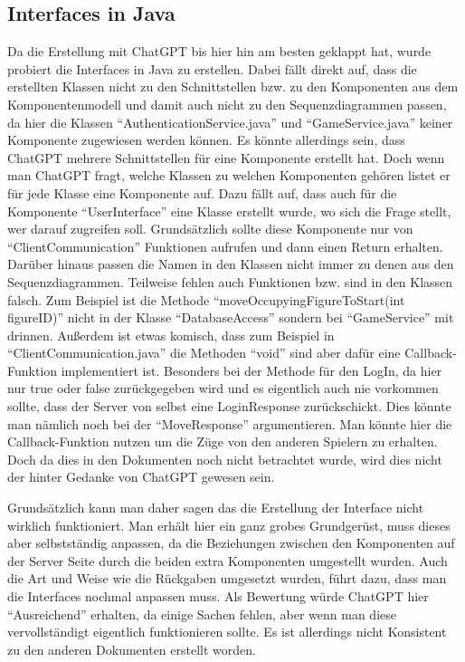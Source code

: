 \subsection*{Interfaces in Java}

Da die Erstellung mit ChatGPT bis hier hin am besten geklappt hat, wurde probiert die Interfaces in Java 
zu erstellen. Dabei fällt direkt auf, dass die erstellten Klassen nicht zu den Schnittstellen bzw. zu den 
Komponenten aus dem Komponentenmodell und damit auch nicht zu den Sequenzdiagrammen passen, da hier 
die Klassen ``AuthenticationService.java'' und ``GameService.java'' keiner 
Komponente zugewiesen werden können. Es könnte allerdings sein, dass ChatGPT mehrere Schnittstellen für eine 
Komponente erstellt hat. Doch wenn man ChatGPT fragt, welche Klassen zu welchen Komponenten gehören
listet er für jede Klasse eine Komponente auf. Dazu fällt auf, dass auch für die Komponente ``UserInterface''
eine Klasse erstellt wurde, wo sich die Frage stellt, wer darauf zugreifen soll. Grundsätzlich sollte diese 
Komponente nur von ``ClientCommunication'' Funktionen aufrufen und dann einen Return erhalten. Darüber hinaus 
passen die Namen in den Klassen nicht immer zu denen aus den Sequenzdiagrammen. Teilweise fehlen auch 
Funktionen bzw. sind in den Klassen falsch. Zum Beispiel ist die Methode ``moveOccupyingFigureToStart(int figureID)''
nicht in der Klasse ``DatabaseAccess'' sondern bei ``GameService'' mit drinnen. Außerdem ist etwas komisch, dass 
zum Beispiel in ``ClientCommunication.java'' die Methoden ``void'' sind aber dafür eine Callback-Funktion 
implementiert ist. Besonders bei der Methode für den LogIn, da hier nur true oder false zurückgegeben wird und 
es eigentlich auch nie vorkommen sollte, dass der Server von selbst eine LoginResponse zurückschickt. Dies könnte 
man nämlich noch bei der ``MoveResponse'' argumentieren. Man könnte hier die Callback-Funktion nutzen um die Züge 
von den anderen Spielern zu erhalten. Doch da dies in den Dokumenten noch nicht betrachtet wurde, wird dies 
nicht der hinter Gedanke von ChatGPT gewesen sein.

Grundsätzlich kann man daher sagen das die Erstellung der Interface nicht wirklich funktioniert. Man erhält 
hier ein ganz grobes Grundgerüst, muss dieses aber selbstständig anpassen, da die Beziehungen zwischen 
den Komponenten auf der Server Seite durch die beiden extra Komponenten umgestellt wurden. Auch die 
Art und Weise wie die Rückgaben umgesetzt wurden, führt dazu, dass man die Interfaces nochmal anpassen muss.
Als Bewertung würde ChatGPT hier ``Ausreichend'' erhalten, da einige Sachen fehlen, aber wenn man diese vervollständigt 
eigentlich funktionieren sollte. Es ist allerdings nicht Konsistent zu den anderen Dokumenten erstellt worden.

